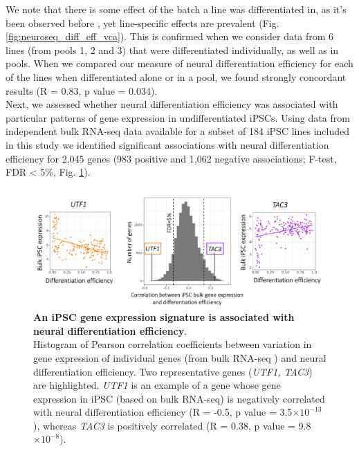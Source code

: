 \newpage

We note that there is some effect of the batch a line was differentiated in, as it's been observed before \cite{kilpinen2017common, schwartzentruber2018molecular}, yet line-specific effects are prevalent (Fig. \ref{fig:neuroseq_diff_eff_vca}).
This is confirmed when we consider data from 6 lines (from pools 1, 2 and 3) that were differentiated individually, as well as in pools.
When we compared our measure of neural differentiation efficiency for each of the lines when differentiated alone or in a pool, we found strongly concordant results (R = 0.83, p value = 0.034).\\ 

Next, we assessed whether neural differentiation efficiency was associated with particular patterns of gene expression in undifferentiated iPSCs. 
Using data from independent bulk RNA-seq data available for a subset of 184 iPSC lines included in this study \cite{kilpinen2017common, bonder2019systematic} we identified significant associations with neural differentiation efficiency for 2,045 genes (983 positive and 1,062 negative associations; F-test, FDR < 5\%, Fig. \ref{fig:neuroseq_ips_expression_signature}). 

\begin{figure}[h]
\centering
\includegraphics[width=16cm]{Chapter5/Fig/neuroseq_ips_bulk_expr_correlations.png}
\caption[iPS expression signature of neural differentiation efficiency]{\textbf{An iPSC gene expression signature is associated with neural differentiation efficiency}.\\
Histogram of Pearson correlation coefficients between variation in gene expression of individual genes (from bulk RNA-seq \cite{bonder2019systematic}) and neural differentiation efficiency. 
Two representative genes (\textit{UTF1, TAC3}) are highlighted. 
\textit{UTF1} is an example of a gene whose gene expression in iPSC (based on bulk RNA-seq) is negatively correlated with neural differentiation efficiency (R = -0.5, p value = 3.5$ \times 10^{-13}$ ), whereas \textit{TAC3} is positively correlated (R = 0.38, p value = 9.8$ \times 10^{-8}$).}
\label{fig:neuroseq_ips_expression_signature}
\end{figure}

